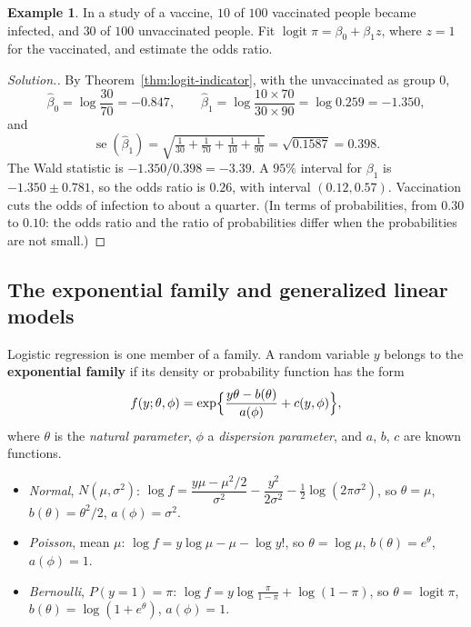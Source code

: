 \documentclass[11pt,a4paper]{article}
\numberwithin{equation}{section}
\theoremstyle{definition}
\newtheorem{exa}[thm]{Example}
\newenvironment{solution}
  {\renewcommand{\qedsymbol}{}\begin{proof}[\textit{Solution}.]}
  {\end{proof}}
\begin{document}
\begin{exa}\label{exa:vaccine}
In a study of a vaccine, $10$ of $100$ vaccinated people became infected, and $30$ of $100$ unvaccinated people. Fit
$\operatorname{logit}\pi = \beta_0 + \beta_1z$, where $z = 1$ for the vaccinated, and estimate the odds ratio.
\end{exa}

\begin{solution}
By Theorem~\ref{thm:logit-indicator}, with the unvaccinated as group $0$,
\[
\hat\beta_0 = \log\frac{30}{70} = -0.847, \qquad \hat\beta_1 = \log\frac{10 \times 70}{30 \times 90} = \log 0.259 = -1.350 ,
\]
and
\[
\operatorname{se}(\hat\beta_1) = \sqrt{\tfrac{1}{30} + \tfrac{1}{70} + \tfrac{1}{10} + \tfrac{1}{90}} = \sqrt{0.1587} = 0.398 .
\]
The Wald statistic is $-1.350/0.398 = -3.39$. A $95\%$ interval for $\beta_1$ is $-1.350 \pm 0.781$, so the odds ratio is
$0.26$, with interval $(0.12, 0.57)$. Vaccination cuts the odds of infection to about a quarter. (In terms of
probabilities, from $0.30$ to $0.10$: the odds ratio and the ratio of probabilities differ when the probabilities are
not small.)
\end{solution}

\subsection{The exponential family and generalized linear models}
Logistic regression is one member of a family. A random variable $y$ belongs to the \textbf{exponential
family} if its density or probability function has the form
\[
f(y; \theta, \phi) = \exp\Bigl\{\frac{y\theta - b(\theta)}{a(\phi)} + c(y, \phi)\Bigr\} ,
\]
where $\theta$ is the \emph{natural parameter}, $\phi$ a \emph{dispersion parameter}, and $a$, $b$, $c$ are known functions.

\begin{itemize}
\item \emph{Normal}, $N(\mu, \sigma^2)$: $\log f = \dfrac{y\mu - \mu^2/2}{\sigma^2} - \dfrac{y^2}{2\sigma^2} - \tfrac12\log(2\pi\sigma^2)$, so $\theta = \mu$,
$b(\theta) = \theta^2/2$, $a(\phi) = \sigma^2$.
\item \emph{Poisson}, mean $\mu$: $\log f = y\log\mu - \mu - \log y!$, so $\theta = \log\mu$, $b(\theta) = e^{\theta}$, $a(\phi) = 1$.
\item \emph{Bernoulli}, $P(y = 1) = \pi$: $\log f = y\log\frac{\pi}{1 - \pi} + \log(1 - \pi)$, so $\theta = \operatorname{logit}\pi$, $b(\theta) = \log(1 + e^{\theta})$,
$a(\phi) = 1$.
\end{itemize}
\end{document}
